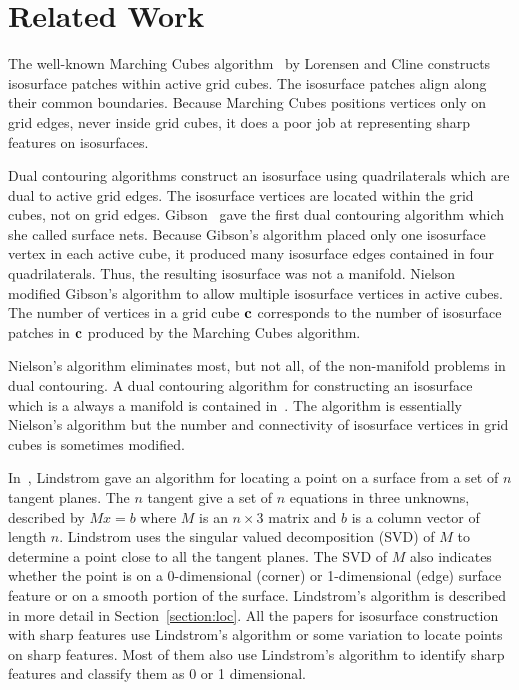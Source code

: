 \section{Related Work}
\label{section:related}

The well-known Marching Cubes algorithm~\cite{lc-mchr3-87}
by Lorensen and Cline
constructs isosurface patches within active grid cubes.
The isosurface patches align along their common boundaries.
Because Marching Cubes positions vertices only on grid edges,
never inside grid cubes,
it does a poor job at representing sharp features on isosurfaces.

Dual contouring algorithms construct an isosurface using quadrilaterals
which are dual to active grid edges.
The isosurface vertices are located within the grid cubes,
not on grid edges.
Gibson~\cite{gh-ssqem-97,g-cesng-98} gave the first dual contouring algorithm
which she called surface nets.
Because Gibson's algorithm placed only one isosurface vertex 
in each active cube,
it produced many isosurface edges contained in four quadrilaterals.
Thus, the resulting isosurface was not a manifold.
Nielson~\cite{n-dmc-04} modified Gibson's algorithm
to allow multiple isosurface vertices in active cubes.
The number of vertices in a grid cube $\mathbf{c}$
corresponds to the number of isosurface patches in $\mathbf{c}$
produced by the Marching Cubes algorithm.

Nielson's algorithm eliminates most, but not all, 
of the non-manifold problems in dual contouring.
A dual contouring algorithm
for constructing an isosurface which is a always a manifold
is contained in~\cite{Wenger:2013:Isosurfaces}.
The algorithm is essentially Nielson's algorithm
but the number and connectivity of isosurface vertices in grid cubes
is sometimes modified.

In~\cite{l-oslpm-00}, Lindstrom gave an algorithm for locating a point 
on a surface from a set of $n$ tangent planes.
The $n$ tangent give a set of $n$ equations in three unknowns,
described by $M x = b$ where $M$ is an $n \times 3$ matrix 
and $b$ is a column vector of length $n$.
Lindstrom uses the singular valued decomposition (SVD) of $M$
to determine a point close to all the tangent planes.
The SVD of $M$ also indicates whether the point is
on a 0-dimensional (corner) or 1-dimensional (edge) surface feature
or on a smooth portion of the surface.
Lindstrom's algorithm is described in more detail 
in Section~\ref{section:loc}.
All the papers for isosurface construction with sharp features
use Lindstrom's algorithm or some variation
to locate points on sharp features.
Most of them also use Lindstrom's algorithm to identify sharp features
and classify them as 0 or 1 dimensional.


